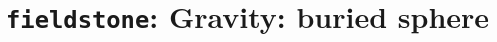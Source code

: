\documentclass[a4paper]{article}
\begin{document}
\newpage
\section{{\tt fieldstone}: Gravity: buried sphere}


\appendix

\newpage
%

\newpage %

\printindex %

\newpage %
\listoftodos[Notes] %
\end{document}
